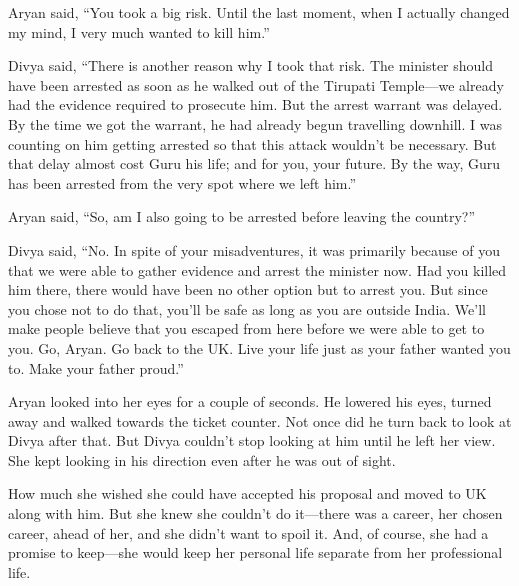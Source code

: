 Aryan said, “You took a big risk. Until the last moment, when I actually changed
my mind, I very much wanted to kill him.”

Divya said, “There is another reason why I took that risk. The minister should
have been arrested as soon as he walked out of the Tirupati Temple—we already
had the evidence required to prosecute him. But the arrest warrant was delayed.
By the time we got the warrant, he had already begun travelling downhill. I was
counting on him getting arrested so that this attack wouldn't be necessary. But
that delay almost cost Guru his life; and for you, your future. By the way,
Guru has been arrested from the very spot where we left him.”

Aryan said, “So, am I also going to be arrested before leaving the country?”

Divya said, “No. In spite of your misadventures, it was primarily because of you
that we were able to gather evidence and arrest the minister now. Had you killed him
there, there would have been no other option but to arrest you. But since you
chose not
to do that, you'll be safe as long as you are outside India. We'll make people
believe that you escaped from here before we were able to get to you. Go, Aryan.
Go back to the UK. Live your life just as your father wanted you to. Make your
father proud.”

Aryan looked into her eyes for a couple of seconds. He lowered his eyes, turned
away and walked towards the ticket counter. Not once did he turn back to look at
Divya after that. But Divya couldn't stop looking at him until he left her view.
She kept looking in his direction even after he was out of sight.

How much she wished she could have accepted his proposal and moved to UK along
with him. But she knew she couldn't do it—there was a career, her chosen career,
ahead of her, and she didn't want to spoil it. And, of course, she had a promise
to keep—she would keep her personal life separate from her professional life.
